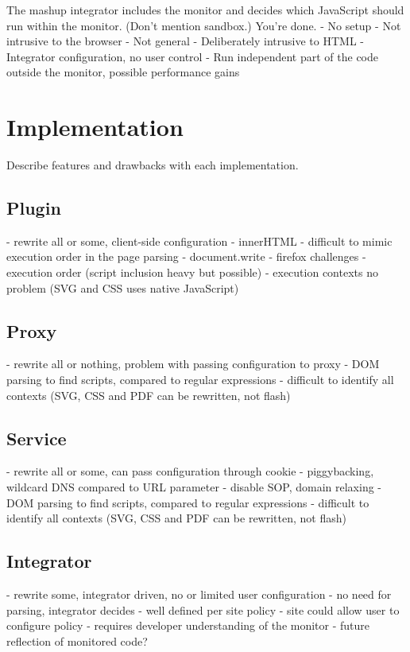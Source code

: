 \documentclass{llncs}
\begin{document}
The mashup integrator includes the monitor and decides which JavaScript should 
run within the monitor. (Don't mention sandbox.) You're done.
- No setup
- Not intrusive to the browser
- Not general
- Deliberately intrusive to HTML
- Integrator configuration, no user control
- Run independent part of the code outside the monitor, possible performance gains


\section{Implementation}
\label{sec:impl}

Describe features and drawbacks with each implementation.

\subsection{Plugin}

- rewrite all or some, client-side configuration
- innerHTML
- difficult to mimic execution order in the page parsing
- document.write
- firefox challenges
- execution order (script inclusion heavy but possible)
- execution contexts no problem (SVG and CSS uses native JavaScript)

\subsection{Proxy}

- rewrite all or nothing, problem with passing configuration to proxy
- DOM parsing to find scripts, compared to regular expressions
- difficult to identify all contexts (SVG, CSS and PDF can be rewritten, not flash)

\subsection{Service}

- rewrite all or some, can pass configuration through cookie
- piggybacking, wildcard DNS compared to URL parameter
- disable SOP, domain relaxing
- DOM parsing to find scripts, compared to regular expressions
- difficult to identify all contexts (SVG, CSS and PDF can be rewritten, not flash)

\subsection{Integrator}

- rewrite some, integrator driven, no or limited user configuration
- no need for parsing, integrator decides
- well defined per site policy
- site could allow user to configure policy
- requires developer understanding of the monitor
- future reflection of monitored code?
\end{document}
